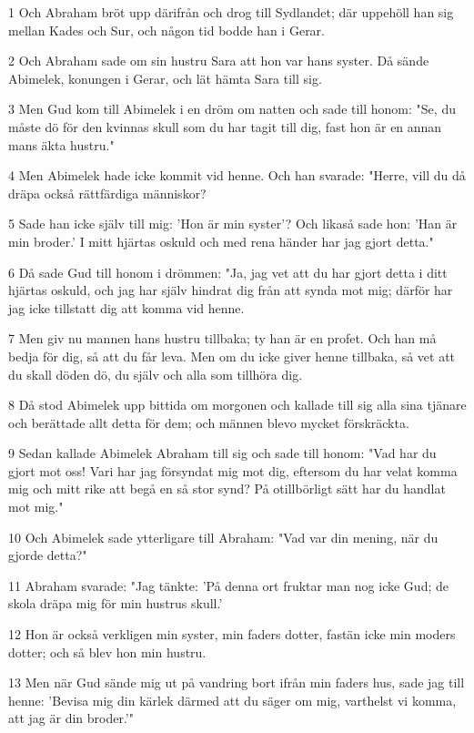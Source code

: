 \par 1 Och Abraham bröt upp därifrån och drog till Sydlandet; där uppehöll han sig mellan Kades och Sur, och någon tid bodde han i Gerar.
\par 2 Och Abraham sade om sin hustru Sara att hon var hans syster. Då sände Abimelek, konungen i Gerar, och lät hämta Sara till sig.
\par 3 Men Gud kom till Abimelek i en dröm om natten och sade till honom: "Se, du måste dö för den kvinnas skull som du har tagit till dig, fast hon är en annan mans äkta hustru."
\par 4 Men Abimelek hade icke kommit vid henne. Och han svarade: "Herre, vill du då dräpa också rättfärdiga människor?
\par 5 Sade han icke själv till mig: 'Hon är min syster'? Och likaså sade hon: 'Han är min broder.' I mitt hjärtas oskuld och med rena händer har jag gjort detta."
\par 6 Då sade Gud till honom i drömmen: "Ja, jag vet att du har gjort detta i ditt hjärtas oskuld, och jag har själv hindrat dig från att synda mot mig; därför har jag icke tillstatt dig att komma vid henne.
\par 7 Men giv nu mannen hans hustru tillbaka; ty han är en profet. Och han må bedja för dig, så att du får leva. Men om du icke giver henne tillbaka, så vet att du skall döden dö, du själv och alla som tillhöra dig.
\par 8 Då stod Abimelek upp bittida om morgonen och kallade till sig alla sina tjänare och berättade allt detta för dem; och männen blevo mycket förskräckta.
\par 9 Sedan kallade Abimelek Abraham till sig och sade till honom: "Vad har du gjort mot oss! Vari har jag försyndat mig mot dig, eftersom du har velat komma mig och mitt rike att begå en så stor synd? På otillbörligt sätt har du handlat mot mig."
\par 10 Och Abimelek sade ytterligare till Abraham: "Vad var din mening, när du gjorde detta?"
\par 11 Abraham svarade: "Jag tänkte: 'På denna ort fruktar man nog icke Gud; de skola dräpa mig för min hustrus skull.'
\par 12 Hon är också verkligen min syster, min faders dotter, fastän icke min moders dotter; och så blev hon min hustru.
\par 13 Men när Gud sände mig ut på vandring bort ifrån min faders hus, sade jag till henne: 'Bevisa mig din kärlek därmed att du säger om mig, varthelst vi komma, att jag är din broder.'"

